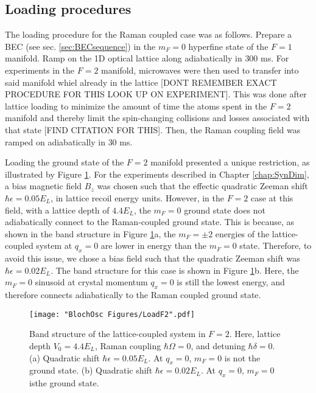 \subsection{Loading procedures}
The loading procedure for the Raman coupled case was  as follows. Prepare a \Rb{} BEC (see sec. \ref{sec:BECsequence}) in the $m_F=0$ hyperfine state of the $F=1$ manifold. Ramp on the 1D optical lattice along \ex{} adiabatically in $300$ ms. For experiments in the $F=2$ manifold, microwaves were then used to transfer into said manifold whiel already in the lattice [DONT REMEMBER EXACT PROCEDURE FOR THIS LOOK UP ON EXPERIMENT]. This was done after lattice loading to minimize the amount of time the atoms spent in the $F=2$ manifold and thereby limit the spin-changing collisions and losses associated with that state [FIND CITATION FOR THIS].   Then, the Raman coupling field was ramped on adiabatically in $30$ ms.

Loading the ground state of the $F=2$ manifold presented a unique restriction, as illustrated by Figure \ref{fig:LoadF2}. For the experiments described in Chapter \ref{chap:SynDim}, a bias magnetic field $B_z$ was chosen such that the effectic quadratic Zeeman shift $\hbar\epsilon = 0.05 E_L$, in lattice recoil energy units. However, in the $F=2$ case at this field, with a lattice depth of $4.4 E_L$, the $m_F=0$ ground state does not adiabatically connect to the Raman-coupled ground state. This is because, as shown in the band structure in Figure \ref{fig:LoadF2}a, the $m_F=\pm2$ energies of the lattice-coupled system at $q_x=0$ are lower in energy than the $m_F=0$ state. Therefore, to avoid this issue, we chose a bias field such that the quadratic Zeeman shift was $\hbar\epsilon = 0.02 E_L$. The band structure for this case is shown in Figure \ref{fig:LoadF2}b. Here, the $m_F=0$ sinusoid at crystal momentum $q_x=0$ is still the lowest energy, and therefore connects adiabatically to the Raman coupled ground state. 
\begin{figure}
\texttt{[image: "BlochOsc Figures/LoadF2".pdf]}
\caption[Band structure of the lattice-coupled system in $F=2$]{Band structure of the lattice-coupled system in $F=2$. Here, lattice depth $V_0=4.4 E_L$, Raman coupling $\hbar\Omega=0$, and detuning $\hbar\delta=0$. (a) Quadratic shift $\hbar\epsilon=0.05 E_L$. At $q_x=0$, $m_F=0$ is not the ground state. (b) Quadratic shift $\hbar\epsilon = 0.02 E_L$.  At $q_x=0$, $m_F=0$ isthe ground state.}
\label{fig:LoadF2}
\end{figure}

